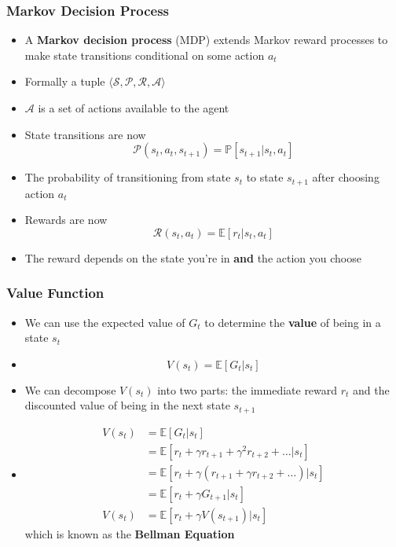 \documentclass{beamer}
\begin{document}
\begin{frame}
  \frametitle{Markov Decision Process}
  \begin{itemize}
    \item A \textbf{Markov decision process} (MDP) extends Markov reward processes to make state transitions conditional on some action $a_t$
    \item Formally a tuple $\langle \mathcal{S}, \mathcal{P}, \mathcal{R}, \mathcal{A} \rangle$
    \item $\mathcal{A}$ is a set of actions available to the agent
    \item State transitions are now $$\mathcal{P}(s_t, a_t, s_{t+1}) = \mathbb{P} \left[ s_{t+1} \vert s_t, a_t \right]$$
    \item The probability of transitioning from state $s_t$ to state $s_{t+1}$ after choosing action $a_t$
    \item Rewards are now
    $$\mathcal{R}(s_t, a_t) = \mathbb{E} \left[ r_t \vert s_t, a_t \right]$$
    \item The reward depends on the state you're in \textbf{and} the action you choose
  \end{itemize}
\end{frame}


\begin{frame}
  \frametitle{Value Function}
  \begin{itemize}
    \item We can use the expected value of $G_t$ to determine the \textbf{value} of being in a state $s_t$
    \item $$V(s_t) = \mathbb{E} \left[ G_t \vert s_t \right]$$
    \item We can decompose $V(s_t)$ into two parts: the immediate reward $r_t$ and the discounted value of being in the next state $s_{t+1}$
    \item \begin{align*}
          V(s_t) &= \mathbb{E} \left[ G_t \vert s_t \right] \\
           &= \mathbb{E} \left[ r_t + \gamma r_{t+1} + \gamma^2 r_{t+2} + \dots \vert s_t \right] \\
           &= \mathbb{E} \left[ r_t + \gamma( r_{t+1} + \gamma r_{t+2} + \dots ) \vert s_t \right] \\
           &= \mathbb{E} \left[ r_t + \gamma G_{t+1} \vert s_t \right] \\
          V(s_t) &= \mathbb{E} \left[ r_t + \gamma V(s_{t+1}) \vert s_t \right]
        \end{align*}
          which is known as the \textbf{Bellman Equation}
  \end{itemize}
\end{frame}
\end{document}
